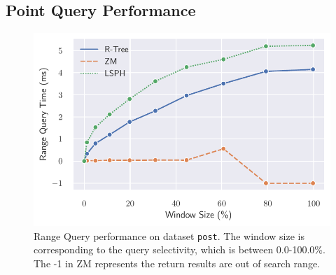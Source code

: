 \subsection{Point Query Performance}
\begin{figure}
    \includegraphics[width=\textwidth]{Figures/range_result.pdf}\hfill
    \caption{Range Query performance on dataset \texttt{post}. The window size is corresponding to the query selectivity, which is between 0.0-100.0\%. The -1 in ZM represents the return results are out of search range.}\label{fig:range_result}
\end{figure}